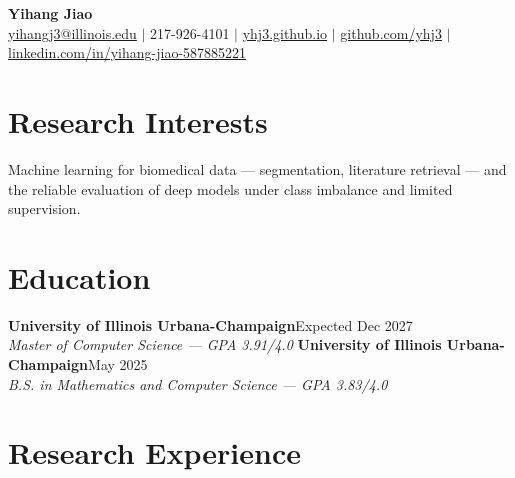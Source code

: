 \documentclass[10pt,letterpaper]{article}
\newcommand{\entry}[3]{\noindent\textbf{#1}\hfill #2\\ \textit{#3}\vspace{1pt}}
\begin{document}
\begin{center}
{\LARGE \textbf{Yihang Jiao}}\\[3pt]
\href{mailto:yihangj3@illinois.edu}{yihangj3@illinois.edu} $|$ 217-926-4101 $|$
\href{https://yhj3.github.io}{yhj3.github.io} $|$
\href{https://github.com/yhj3}{github.com/yhj3} $|$
\href{https://www.linkedin.com/in/yihang-jiao-587885221}{linkedin.com/in/yihang-jiao-587885221}
\end{center}

\section*{Research Interests}
Machine learning for biomedical data --- segmentation, literature retrieval --- and the reliable
evaluation of deep models under class imbalance and limited supervision.

\section*{Education}
\entry{University of Illinois Urbana-Champaign}{Expected Dec 2027}{Master of Computer Science --- GPA 3.91/4.0}
\entry{University of Illinois Urbana-Champaign}{May 2025}{B.S. in Mathematics and Computer Science --- GPA 3.83/4.0}

\section*{Research Experience}
\end{document}
